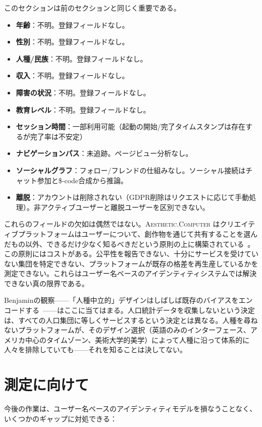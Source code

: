 \documentclass[10pt,letterpaper,twocolumn]{article}
\newcommand{\ac}{\textsc{Aesthetic.Computer}}
\begin{document}
このセクションは前のセクションと同じく重要である。

\begin{itemize}
  \item \textbf{年齢}：不明。登録フィールドなし。
  \item \textbf{性別}：不明。登録フィールドなし。
  \item \textbf{人種/民族}：不明。登録フィールドなし。
  \item \textbf{収入}：不明。登録フィールドなし。
  \item \textbf{障害の状況}：不明。登録フィールドなし。
  \item \textbf{教育レベル}：不明。登録フィールドなし。
  \item \textbf{セッション時間}：一部利用可能（起動の開始/完了タイムスタンプは存在するが完了率は不安定）
  \item \textbf{ナビゲーションパス}：未追跡。ページビュー分析なし。
  \item \textbf{ソーシャルグラフ}：フォロー/フレンドの仕組みなし。ソーシャル接続はチャット参加と\$-code合成から推論。
  \item \textbf{離脱}：アカウントは削除されない（GDPR削除はリクエストに応じて手動処理）。非アクティブユーザーと離脱ユーザーを区別できない。
\end{itemize}

これらのフィールドの欠如は偶然ではない。\ac{} はクリエイティブプラットフォームはユーザーについて、創作物を通じて共有することを選んだもの以外、できるだけ少なく知るべきだという原則の上に構築されている~\citep{illich1973tools}。この原則にはコストがある。公平性を報告できない、十分にサービスを受けていない集団を特定できない、プラットフォームが既存の格差を再生産しているかを測定できない。これらはユーザー名ベースのアイデンティティシステムでは解決できない真の限界である。

Benjaminの観察——「人種中立的」デザインはしばしば既存のバイアスをエンコードする~\citep{benjamin2019race}——はここに当てはまる。人口統計データを収集しないという決定は、すべての人口集団に等しくサービスするという決定とは異なる。人種を尋ねないプラットフォームが、そのデザイン選択（英語のみのインターフェース、アメリカ中心のタイムゾーン、美術大学的美学）によって人種に沿って体系的に人々を排除していても——それを知ることは決してない。

\section{測定に向けて}

今後の作業は、ユーザー名ベースのアイデンティティモデルを損なうことなく、いくつかのギャップに対処できる：
\end{document}
